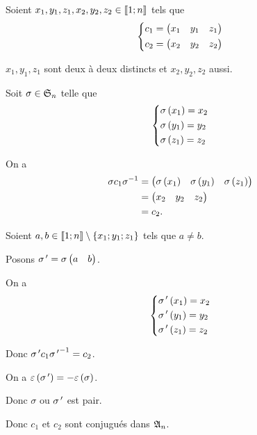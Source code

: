 \begin{corr}[5]
Soient \(x_1,y_1,z_1,x_2,y_2,z_2\in\interventierii{1}{n}\) tels que \[\begin{dcases}c_1=\begin{pmatrix}x_1 & y_1 & z_1\end{pmatrix} \\ c_2=\begin{pmatrix}x_2 & y_2 & z_2\end{pmatrix}\end{dcases}\]

\(x_1,y_1,z_1\) sont deux à deux distincts et \(x_2,y_2,z_2\) aussi.

Soit \(\sigma\in\S{n}\) telle que \[\begin{dcases}\sigma\paren{x_1}=x_2 \\ \sigma\paren{y_1}=y_2 \\ \sigma\paren{z_1}=z_2\end{dcases}\]

On a \[\begin{aligned}
\sigma c_1\sigma\inv&=\begin{pmatrix}\sigma\paren{x_1} & \sigma\paren{y_1} & \sigma\paren{z_1}\end{pmatrix} \\
&=\begin{pmatrix}x_2 & y_2 & z_2\end{pmatrix} \\
&=c_2.
\end{aligned}\]

Soient \(a,b\in\interventierii{1}{n}\excluant\accol{x_1;y_1;z_1}\) tels que \(a\not=b\).

Posons \(\sigma\prim=\sigma\begin{pmatrix}a & b\end{pmatrix}\).

On a \[\begin{dcases}
\sigma\prim\paren{x_1}=x_2 \\
\sigma\prim\paren{y_1}=y_2 \\
\sigma\prim\paren{z_1}=z_2
\end{dcases}\]

Donc \(\sigma\prim c_1{\sigma\prim}\inv=c_2\).

On a \(\epsilon\paren{\sigma\prim}=-\epsilon\paren{\sigma}\).

Donc \(\sigma\) ou \(\sigma\prim\) est pair.

Donc \(c_1\) et \(c_2\) sont conjugués dans \(\frakA{n}\).
\end{corr}

